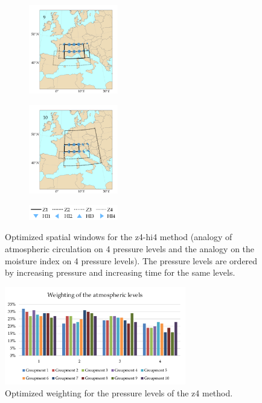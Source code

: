\documentclass[twocol]{ametsoc}
\begin{document}
\begin{figure}[htb]
\begin{subfigure}{.5\columnwidth}
		\centering
		\includegraphics[width=3.9cm]{figures/spatial_win_z4-hi4/Spatial_windows_9.png}
	\end{subfigure}%
	\begin{subfigure}{.5\columnwidth}
		\centering
		\includegraphics[width=3.9cm]{figures/spatial_win_z4-hi4/Spatial_windows_10.png}
	\end{subfigure}
	\begin{subfigure}{.5\columnwidth}
		\centering
		\includegraphics[width=3.9cm]{figures/spatial_win_z4-hi4/legend.png}
	\end{subfigure}
	\caption{Optimized spatial windows for the z4-hi4 method (analogy of atmospheric circulation on 4 pressure levels and the analogy on the moisture index on 4 pressure levels). The pressure levels are ordered by increasing pressure and increasing time for the same levels.}
	\label{fig:spatial_windows_z4-hi4}
\end{figure}


\begin{figure}[htb]
	\centerline{\includegraphics[width=7.9cm]{figures/figure_levels_weights.pdf}}
	\caption{Optimized weighting for the pressure levels of the z4 method.}
	\label{fig:levels_weights}
\end{figure}
\end{document}
